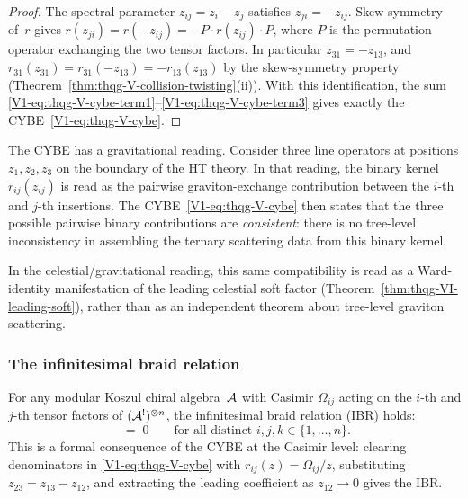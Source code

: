 \begin{proof}
The spectral parameter $z_{ij} = z_i - z_j$ satisfies
$z_{ji} = -z_{ij}$. Skew-symmetry of~$r$ gives
$r(z_{ji}) = r(-z_{ij}) = -P \cdot r(z_{ij}) \cdot P$, where
$P$ is the permutation operator exchanging the two tensor factors.
In particular $z_{31} = -z_{13}$, and
$r_{31}(z_{31}) = r_{31}(-z_{13}) = -r_{13}(z_{13})$
by the skew-symmetry property
(Theorem~\ref{thm:thqg-V-collision-twisting}(ii)).
With this identification, the sum
\eqref{V1-eq:thqg-V-cybe-term1}--\eqref{V1-eq:thqg-V-cybe-term3}
gives exactly the CYBE~\eqref{V1-eq:thqg-V-cybe}.
\end{proof}

\begin{remark}
The CYBE has a gravitational reading.
Consider three line operators at positions $z_1, z_2, z_3$ on the
boundary of the HT theory. In that reading, the binary kernel
$r_{ij}(z_{ij})$ is read as the pairwise graviton-exchange
contribution between the $i$-th and $j$-th insertions. The
CYBE~\eqref{V1-eq:thqg-V-cybe} then states that the three possible
pairwise binary contributions are \emph{consistent}: there is no
tree-level inconsistency in assembling the ternary scattering data
from this binary kernel.

In the celestial/gravitational reading, this same compatibility is
read as a Ward-identity manifestation of the leading celestial soft
factor (Theorem~\ref{thm:thqg-VI-leading-soft}), rather than as an
independent theorem about tree-level graviton
scattering.
\end{remark}


\subsubsection{The infinitesimal braid relation}

\begin{corollary}
\label{cor:thqg-V-ibr}
For any modular Koszul chiral algebra~$\mathcal{A}$ with Casimir
$\Omega_{ij}$ acting on the $i$-th and $j$-th tensor factors of
$(\mathcal{A}^!)^{\otimes n}$, the infinitesimal braid relation
\textup{(}IBR\textup{)} holds:
\begin{equation}%
[\Omega_{ij},\;\Omega_{ik} + \Omega_{jk}] \;=\; 0
\qquad
\text{for all distinct } i,j,k \in \{1,\dotsc,n\}.
\end{equation}
This is a formal consequence of the CYBE at the Casimir level:
clearing denominators in \eqref{V1-eq:thqg-V-cybe} with
$r_{ij}(z) = \Omega_{ij}/z$, substituting $z_{23} = z_{13} - z_{12}$,
and extracting the leading coefficient as $z_{12} \to 0$ gives the
IBR\@.
\end{corollary}

